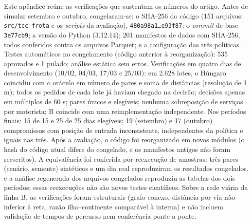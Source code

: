 
Este apêndice reúne as verificações que sustentam os números do artigo. Antes de simular setembro e outubro, congelaram-se: o SHA-256 do código (151 arquivos: \texttt{src/tcc\_frota} e os \textit{scripts} da avaliação), \texttt{480a98a1\ldots e93f87}; o \textit{commit} de base \texttt{3e77cb9}; a versão do Python (3.12.14); 201 manifestos de dados com SHA-256, todos conferidos contra os arquivos Parquet; e a configuração das três políticas. Testes automáticos no congelamento (código anterior à reorganização): 535 aprovados e 1 pulado; análise estática sem erros. Verificações em quatro dias de desenvolvimento (10/02, 04/03, 17/03 e 25/03): em 2.628 lotes, o Húngaro coincidiu com o oráculo em número de pares e soma de distâncias (resolução de 1 m); todos os pedidos de cada lote já haviam chegado na decisão; decisões apenas em múltiplos de 60 s; pares únicos e elegíveis; nenhuma sobreposição de serviços por motorista; B coincide com uma reimplementação independente. Nos períodos finais: 15 de 15 e 25 de 25 dias elegíveis; 19 (setembro) e 17 (outubro) compromissos com posição de entrada inconsistente, independentes da política e iguais nas três. Após a avaliação, o código foi reorganizado em novos módulos (o hash do código atual difere do congelado, e os manifestos antigos não foram reescritos). A equivalência foi conferida por reexecução de amostras: três pares (cenário, semente) sintéticos e um dia real reproduziram os resultados congelados, e a análise regenerada dos arquivos congelados reproduziu as tabelas dos dois períodos; essas reexecuções não são novos testes científicos. Sobre a rede viária da linha B, as verificações foram estruturais (grafo conexo, distância por via não inferior à reta, razão ilha--continente comparável à interna) e não incluem validação de tempos de percurso nem conferência ponte a ponte.
